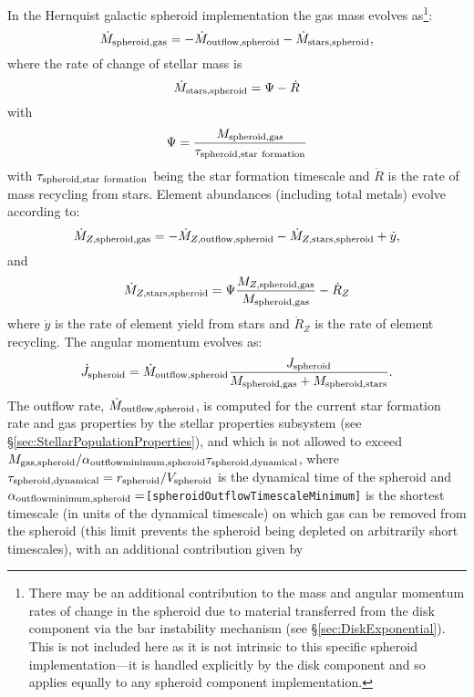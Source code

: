 In the Hernquist galactic spheroid implementation the gas mass evolves as\footnote{There may be an additional contribution to the mass and angular momentum rates of change in the spheroid due to material transferred from the disk component via the bar instability mechanism (see \S\protect\ref{sec:DiskExponential}). This is not included here as it is not intrinsic to this specific spheroid implementation---it is handled explicitly by the disk component and so applies equally to any spheroid component implementation.}:
\begin{equation}
 \dot{M}_{\rm spheroid, gas} = - \dot{M}_{\rm outflow, spheroid} - \dot{M}_{\rm stars, spheroid},
\end{equation}
where the rate of change of stellar mass is
\begin{equation}
 \dot{M}_{\rm stars, spheroid} = \Psi - \dot{R}
\end{equation}
with
\begin{equation}
 \Psi = {M_{\rm spheroid, gas} \over \tau_{\rm spheroid, star~formation}}
\end{equation}
with $\tau_{\rm spheroid, star~formation}$ being the star formation timescale and $\dot{R}$ is the rate of mass recycling from stars.
Element abundances (including total metals) evolve according to:
\begin{equation}
  \dot{M}_{Z, {\rm spheroid, gas}} = - \dot{M}_{Z, {\rm outflow, spheroid}} - \dot{M}_{Z, {\rm stars, spheroid}} + \dot{y},
\end{equation}
and
\begin{equation}
 \dot{M}_{Z, {\rm stars, spheroid}} = \Psi {M_{Z, {\rm spheroid, gas}} \over M_{\rm spheroid, gas}} - \dot{R}_Z
\end{equation}
where $\dot{y}$ is the rate of element yield from stars and $\dot{R}_Z$ is the rate of element recycling. The angular momentum evolves as:
\begin{equation}
 \dot{J}_{\rm spheroid} = \dot{M}_{\rm outflow, spheroid} {J_{\rm spheroid} \over M_{\rm spheroid, gas} + M_{\rm spheroid, stars}}.
\end{equation}
The outflow rate, $\dot{M}_{\rm outflow, spheroid}$, is computed for the current star formation rate and gas properties by the stellar properties subsystem (see \S\ref{sec:StellarPopulationProperties}), and which is not allowed to exceed $M_{\rm gas, spheroid}/ \alpha_{\rm outflow minimum, spheroid} \tau_{\rm spheroid, dynamical}$, where $\tau_{\rm spheroid, dynamical}=r_{\rm spheroid}/V_{\rm spheroid}$ is the dynamical time of the spheroid and $\alpha_{\rm outflow minimum, spheroid}=${\tt [spheroidOutflowTimescaleMinimum]} is the shortest timescale (in units of the dynamical timescale) on which gas can be removed from the spheroid (this limit prevents the spheroid being depleted on arbitrarily short timescales), with an additional contribution given by
